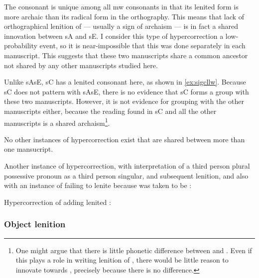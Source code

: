 The consonant  is unique among all \gls{mw} consonants in that its lenited form is more archaic than its radical form in the orthography. This means that lack of orthographical lenition of --- usually a sign of archaism --- is in fact a shared innovation between \gls{sA} and \gls{sE}. I consider this type of hypercorrection a low-probability event, so it is  near-impossible that this was done separately in each manuscript.  This suggests that these two manuscripts share a common ancestor not shared by any other manuscripts studied here.

Unlike \gls{sA}\gls{sE}, \gls{sC} has a lenited consonant here, as shown in \ref{ex:sigcllw}.
Because \gls{sC} does not pattern with \gls{sA}\gls{sE}, there is no evidence that \gls{sC} forms a group with these two manuscripts. However, it is not  evidence for grouping with the other manuscripts either, because the reading   found in \gls{sC} and all the other manuscripts is a shared archaism\footnote{One might argue that there is little phonetic difference between  and . Even if this plays a role in writing lenition of , there would be little reason to innovate towards , precisely because there is no difference.}. 

No other instances of hypercorrection exist that are shared between more than one mansucript.

Another instance of hypercorrection, with interpretation of a third person plural possessive pronoun as a third person singular, and subsequent lenition, and also with an instance of failing to lenite  because  was taken to be :

Hypercorrection of adding lenited :
\begin{mwl}
\end{mwl}
\subsubsection{Object lenition}
\label{sec:object-lenition}

